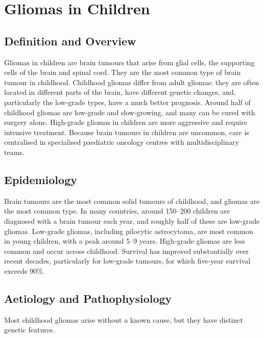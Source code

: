 \chapter{Gliomas in Children}

\section*{Definition and Overview}
Gliomas in children are brain tumours that arise from glial cells, the supporting cells of the brain and spinal cord. They are the most common type of brain tumour in childhood. Childhood gliomas differ from adult gliomas: they are often located in different parts of the brain, have different genetic changes, and, particularly the low-grade types, have a much better prognosis. Around half of childhood gliomas are low-grade and slow-growing, and many can be cured with surgery alone. High-grade gliomas in children are more aggressive and require intensive treatment. Because brain tumours in children are uncommon, care is centralised in specialised paediatric oncology centres with multidisciplinary teams.

\section*{Epidemiology}
Brain tumours are the most common solid tumours of childhood, and gliomas are the most common type. In many countries, around 150--200 children are diagnosed with a brain tumour each year, and roughly half of these are low-grade gliomas. Low-grade gliomas, including pilocytic astrocytoma, are most common in young children, with a peak around 5--9 years. High-grade gliomas are less common and occur across childhood. Survival has improved substantially over recent decades, particularly for low-grade tumours, for which five-year survival exceeds 90\%.

\section*{Aetiology and Pathophysiology}
Most childhood gliomas arise without a known cause, but they have distinct genetic features.

